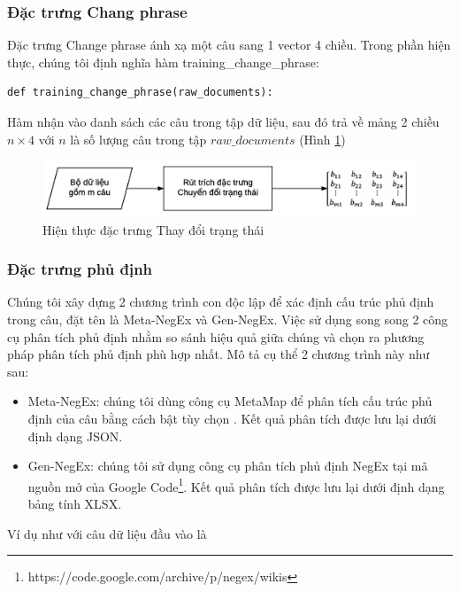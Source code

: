 \subsubsection*{Đặc trưng Chang phrase}
Đặc trưng Change phrase ánh xạ một câu sang 1 vector 4 chiều. Trong phần hiện thực, chúng tôi định nghĩa hàm training\_change\_phrase:
\begin{lstlisting}
def training_change_phrase(raw_documents):
\end{lstlisting}
Hàm nhận vào danh sách các câu trong tập dữ liệu, sau đó trả về mảng 2 chiều $n \times 4$ với $n$ là số lượng câu trong tập $raw\_documents$ (Hình \ref{fig:hien-thuc-changephrase})
\begin{figure}[h]
\centering
\includegraphics[scale=0.7]{../hinh/hien_thuc_changephrase.png}
\caption{Hiện thực đặc trưng Thay đổi trạng thái} \label{fig:hien-thuc-changephrase}
\end{figure}
\subsubsection*{Đặc trưng phủ định}
Chúng tôi xây dựng 2 chương trình con độc lập để xác định cấu trúc phủ định trong câu, đặt tên là Meta-NegEx và Gen-NegEx. Việc sử dụng song song 2 công cụ phân tích phủ định nhằm so sánh hiệu quả giữa chúng và chọn ra phương pháp phân tích phủ định phù hợp nhất. Mô tả cụ thể 2 chương trình này như sau:
\begin{itemize}
\item Meta-NegEx: chúng tôi dùng công cụ MetaMap để phân tích cấu trúc phủ định của câu bằng cách bật tùy chọn . Kết quả phân tích được lưu lại dưới định dạng JSON.

\item Gen-NegEx: chúng tôi sử dụng công cụ phân tích phủ định NegEx tại mã nguồn mở của Google Code\footnote{https://code.google.com/archive/p/negex/wikis}. Kết quả phân tích được lưu lại dưới định dạng bảng tính XLSX. 
\end{itemize}

Ví dụ như với câu dữ liệu đầu vào là \\

